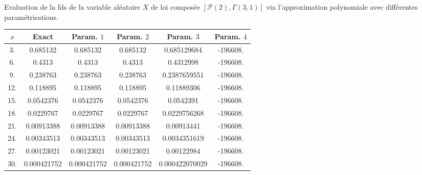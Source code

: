 \begin{tableth}
		\caption[Approximations polynomiales de la \gls{fds} d'une loi $\left(\mathcal{P}(2),\Gamma(3,1)\right)$]{Evaluation de la \gls{fds} de la variable aléatoire $X$ de loi composée $\left[\mathcal{P}(2),\Gamma(3,1)\right]$ via l'approximation polynomiale avec différentes paramétrisations.}
			\label{TableSurvivalPolynomialCompoundPoissonGamma}
		\begin{tabular}{|c||c|c|c|c|c|}
\hline
$x$ & Exact&Param. $1$  &Param. $2$&Param. $3$&Param. $4$ \\
\hline
\hline
3. & 0.685132 & 0.685132 & 0.685132 & 0.685129684 & -196608. \\
 6. & 0.4313 & 0.4313 & 0.4313 & 0.4312998 & -196608. \\
 9. & 0.238763 & 0.238763 & 0.238763 & 0.2387659551 & -196608. \\
 12. & 0.118895 & 0.118895 & 0.118895 & 0.11889306 & -196608. \\
 15. & 0.0542376 & 0.0542376 & 0.0542376 & 0.0542391 & -196608. \\
 18. & 0.0229767 & 0.0229767 & 0.0229767 & 0.0229756268 & -196608. \\
 21. & 0.00913388 & 0.00913388 & 0.00913388 & 0.00913441 & -196608. \\
 24. & 0.00343513 & 0.00343513 & 0.00343513 & 0.0034351619 & -196608. \\
 27. & 0.00123021 & 0.00123021 & 0.00123021 & 0.00122984 & -196608. \\
 30. & 0.000421752 & 0.000421752 & 0.000421752 & 0.000422070029 & -196608. \\

\hline
		\end{tabular}
	\end{tableth}

